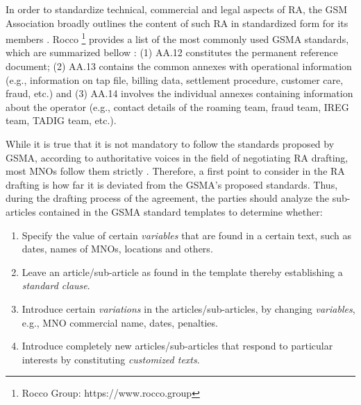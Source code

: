 \documentclass[conference]{style/IEEEtran}
\begin{document}
In order to standardize technical, commercial and legal aspects of RA, the GSM Association broadly outlines the content of such RA in standardized form for its members \cite{Ferwerda2018}. Rocco \footnote{Rocco Group: https://www.rocco.group} provides a list of the most commonly used GSMA standards, which are summarized bellow \cite{ROCCO2017}: (1) AA.12 constitutes the permanent reference document; (2) AA.13 contains the common annexes with operational information (e.g., information on tap file, billing data, settlement procedure, customer care, fraud, etc.) and (3) AA.14 involves the individual annexes containing information about the operator (e.g., contact details of the roaming team, fraud team, IREG team, TADIG team, etc.).

While it is true that it is not mandatory to follow the standards proposed by GSMA, according to authoritative voices in the field of negotiating RA drafting, most MNOs follow them strictly \cite{ROCCO2017a}. Therefore, a first point to consider in the RA drafting is how far it is deviated from the GSMA's proposed standards. Thus, during the drafting process of the agreement, the parties should analyze the sub-articles contained in the GSMA standard templates to determine whether:

\begin{enumerate}
\item Specify the value of certain \textit{variables} that are found in a certain text, such as dates, names of MNOs, locations and others.

\item Leave an article/sub-article as found in the template thereby establishing a \textit{standard clause}.

\item Introduce certain \textit{variations} in the articles/sub-articles, by changing \textit{variables}, e.g., MNO commercial name, dates, penalties.

\item Introduce completely new articles/sub-articles that respond to particular interests by constituting \textit{customized texts}.

\end{enumerate}
\end{document}
